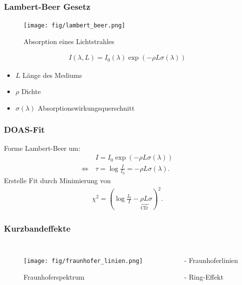 \documentclass{beamer}
\begin{document}
\begin{frame}
    \frametitle{Lambert-Beer Gesetz}
    \begin{figure}[h]
        \texttt{[image: fig/lambert\_beer.png]}
        \caption{Absorption eines Lichtstrahles \cite{atm_script}}
    \end{figure}
    \begin{align}
    	I(\lambda, L) = I_0 (\lambda) \exp (- \rho  L \sigma (\lambda) )
    \end{align}
    \begin{itemize}
        \item $L$ Länge des Mediums
        \item $\rho$ Dichte
        \item $\sigma (\lambda)$ Absorptionswirkungsquerschnitt %
    \end{itemize}
\end{frame}

\begin{frame}
    \frametitle{DOAS-Fit}
    Forme Lambert-Beer um:
	\begin{align}
        & I = I_0 \exp (-\rho L \sigma (\lambda)) \\
        \Leftrightarrow \ &\tau = \log \frac{I}{I_0} = - \rho L \sigma (\lambda).
	\end{align}
    \pause
	Erstelle Fit durch Minimierung von
    \begin{align}
        \chi^2 = ( \log \frac{I_0}{I} -\underbrace{\rho L}_{\text{CD}} \sigma )^2. 
    \end{align}
\end{frame}

\begin{frame}
    \frametitle{Kurzbandeffekte}
    \begin{columns}
    	\begin{figure}
        	\texttt{[image: fig/fraunhofer\_linien.png]}
        	\caption{Fraunhoferspektrum \cite{fraunhofer}}
    	\end{figure}
        \begin{itemize}
			\item[-]{Fraunhoferlinien}
        	\pause
        	\item[-]{Ring-Effekt}
        \end{itemize}
    \end{columns}
\end{frame}
\end{document}

